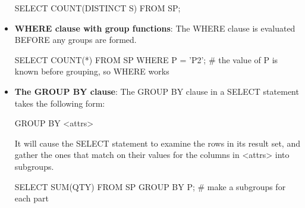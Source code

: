 \documentclass{report}
\begin{document}
\begin{itemize}
            \begin{sqlcode}
            SELECT COUNT(DISTINCT S) FROM SP;
            \end{sqlcode}
            \bigbreak \noindent
        \item \textbf{WHERE clause with group functions}: The WHERE clause is evaluated BEFORE any groups are formed.
            \bigbreak \noindent 
            \begin{sqlcode}
                SELECT COUNT(*)
                    FROM SP
                    WHERE P = 'P2'; # the value of P is known before grouping, so WHERE works
            \end{sqlcode}
        \item \textbf{The GROUP BY clause}: The GROUP BY clause in a SELECT statement takes the following form:
            \bigbreak \noindent 
            \begin{sqlcode}
            GROUP BY <attrs>
            \end{sqlcode}
            \bigbreak \noindent 
            It will cause the SELECT statement to examine the rows in its result set, and gather the ones that match on their values for the columns in <attrs> into subgroups.
            \bigbreak \noindent 
            \begin{sqlcode}
            SELECT SUM(QTY) FROM SP
                GROUP BY P; # make a subgroups for each part


\end{sqlcode}
\end{itemize}
\end{document}
